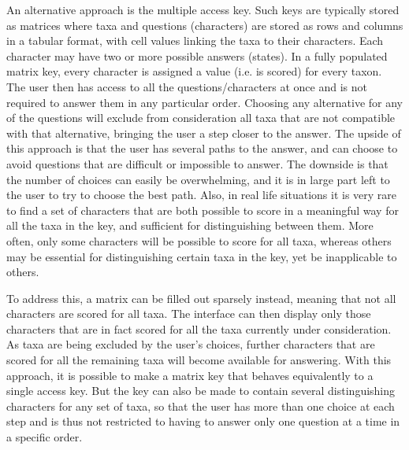 \documentclass[10pt,letterpaper]{article}
\begin{document}
An alternative approach is the multiple access key. Such keys are typically stored as matrices where taxa and questions (characters) are stored as rows and columns in a tabular format, with cell values linking the taxa to their characters. Each character may have two or more possible answers (states). In a fully populated matrix key, every character is assigned a value (i.e. is scored) for every taxon. The user then has access to all the questions/characters at once and is not required to answer them in any particular order. Choosing any alternative for any of the questions will exclude from consideration all taxa that are not compatible with that alternative, bringing the user a step closer to the answer. The upside of this approach is that the user has several paths to the answer, and can choose to avoid questions that are difficult or impossible to answer. The downside is that the number of choices can easily be overwhelming, and it is in large part left to the user to try to choose the best path. Also, in real life situations it is very rare to find a set of characters that are both possible to score in a meaningful way for all the taxa in the key, and sufficient for distinguishing between them. More often, only some characters will be possible to score for all taxa, whereas others may be essential for distinguishing certain taxa in the key, yet be inapplicable to others.

To address this, a matrix can be filled out sparsely instead, meaning that not all characters are scored for all taxa. The interface can then display only those characters that are in fact scored for all the taxa currently under consideration. As taxa are being excluded by the user’s choices, further characters that are scored for all the remaining taxa will become available for answering. With this approach, it is possible to make a matrix key that behaves equivalently to a single access key. But the key can also be made to contain several distinguishing characters for any set of taxa, so that the user has more than one choice at each step and is thus not restricted to having to answer only one question at a time in a specific order.
\end{document}
